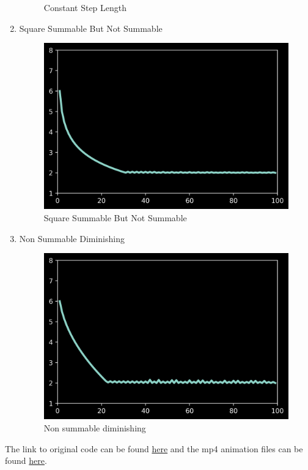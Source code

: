 \documentclass[twoside,twocolumn]{article}
\begin{document}
\begin{enumerate}
\begin{figure}[H]
        \caption{Constant Step Length}
        \label{constantsteplength}
    \end{figure}
    \item Square Summable But Not Summable
    \begin{figure}[H]
        \centering
        \includegraphics[scale=0.5]{../../step/squaresummablebutnotsummable.png}
        \caption{Square Summable But Not Summable}
        \label{squaresummablebutnotsummable}
    \end{figure}
    \item Non Summable Diminishing
    \begin{figure}[H]
        \centering
        \includegraphics[scale=0.5]{../../step/nonsummablediminishing.png}
        \caption{Non summable diminishing}
        \label{nonsummablediminishing}
    \end{figure}
\end{enumerate}
The link to original code can be found \href{}{here} and the mp4 animation files can be found \href{}{here}.
    
\end{document}

